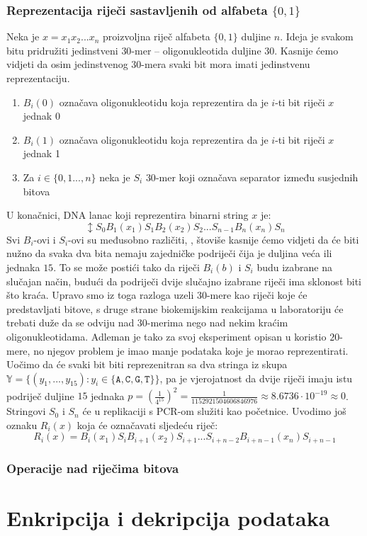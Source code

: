\documentclass[a4paper,oneside,12pt]{memoir} %
\begin{document}
\begin{spacing}{1.5}
\subsubsection{Reprezentacija riječi sastavljenih od alfabeta $\{0,1\}$}
Neka je $x=x_1x_2...x_n$ proizvoljna riječ alfabeta $\{0,1\}$ duljine $n$. Ideja je svakom bitu pridružiti jedinstveni $30$-mer -- oligonukleotida duljine $30$. Kasnije ćemo vidjeti da osim jedinstvenog $30$-mera svaki bit mora imati jedinstvenu reprezentaciju.
\begin{enumerate}
\item $B_i (0)$ označava oligonukleotidu koja reprezentira da je $i$-ti bit riječi $x$ jednak 0
\item $B_i(1)$ označava oligonukleotidu koja reprezentira da je $i$-ti bit riječi $x$ jednak 1
\item Za $i \in \{0,1...,n\}$ neka je $S_i$ $30$-mer koji označava separator između susjednih bitova
\end{enumerate}   
U konačnici, DNA lanac koji reprezentira binarni string $x$ je:
\[\updownarrow S_0 B_1(x_1)S_1B_2(x_2)S_2...S_{n-1}B_n(x_n)S_n\]
Svi $B_i$-ovi i $S_i$-ovi su međusobno različiti, , štoviše kasnije ćemo vidjeti da će biti nužno da svaka dva bita nemaju zajedničke podriječi čija je duljina veća ili jednaka $15$. To se može postići tako da riječi $B_i(b)$ i $S_i$ budu izabrane na slučajan način, budući da podriječi dvije slučajno izabrane riječi ima sklonost biti što kraća. Upravo smo iz toga razloga uzeli $30$-mere kao riječi koje će predstavljati bitove, s druge strane biokemijskim reakcijama u laboratoriju će trebati duže da se odviju nad $30$-merima nego nad nekim kraćim oligonukleotidama. Adleman je tako za svoj eksperiment opisan u \cite{Adleman} koristio $20$-mere, no njegov problem je imao manje podataka koje je morao reprezentirati. Uočimo da će svaki bit biti reprezenitran sa dva stringa iz skupa $\mathbb{Y}=\{(y_1,...,y_15): y_i \in \mathtt{\{A,C,G,T\}\}}$, pa je vjerojatnost da dvije riječi imaju istu podriječ duljine $15$ jednaka $p=\left(\frac{1}{4^{15}}\right)^2=\frac{1}{1152921504606846976}\approx 8.6736 \cdot 10^{-19}\approx 0$. Stringovi $S_0$ i $S_n$ će u replikaciji s PCR-om služiti kao početnice. Uvodimo još oznaku $R_i(x)$ koja će označavati sljedeću riječ:
\[R_i(x)=B_i(x_1)S_iB_{i+1}(x_2)S_{i+1}...S_{i+n-2}B_{i+n-1}(x_n)S_{i+n-1}\]
\subsubsection{Operacije nad riječima bitova}

\section{Enkripcija i dekripcija podataka}

\newpage
\nocite{*}


\end{spacing}
\end{document}
